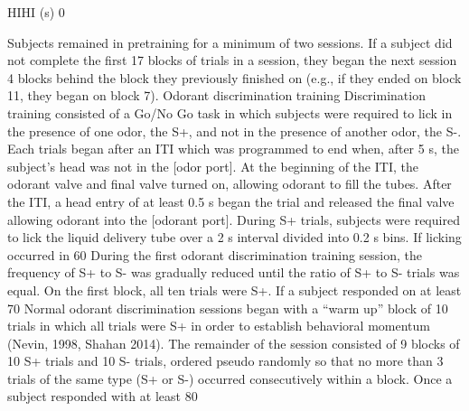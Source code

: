  
HIHI (s)
0
 
 
 
 
 
 
 
 
 
 
 
 
 
 
 
 
 
Subjects remained in pretraining for a minimum of two sessions.  If a subject did not complete the first 17 blocks of trials in a session, they began the next session 4 blocks behind the block they previously finished on (e.g., if they ended on block 11, they began on block 7).
Odorant discrimination training
Discrimination training consisted of a Go/No Go task in which subjects were required to lick in the presence of one odor, the S+, and not in the presence of another odor, the S-.  Each trials began after an ITI which was programmed to end when, after 5 s, the subject’s head was not in the [odor port]. At the beginning of the ITI, the odorant valve and final valve turned on, allowing odorant to fill the tubes. After the ITI, a head entry of at least 0.5 s began the trial and released the final valve allowing odorant into the [odorant port]. During S+ trials, subjects were required to lick the liquid delivery tube over a 2 s interval divided into 0.2 s bins. If licking occurred in 60%
During the first odorant discrimination training session, the frequency of S+ to S- was gradually reduced until the ratio of S+ to S- trials was equal. On the first block, all ten trials were S+. If a subject responded on at least 70%
Normal odorant discrimination sessions began with a “warm up” block of 10 trials in which all trials were S+ in order to establish behavioral momentum (Nevin, 1998, Shahan 2014).  The remainder of the session consisted of 9 blocks of 10 S+ trials and 10 S- trials, ordered pseudo randomly so that no more than 3 trials of the same type (S+ or S-) occurred consecutively within a block. Once a subject responded with at least 80%

